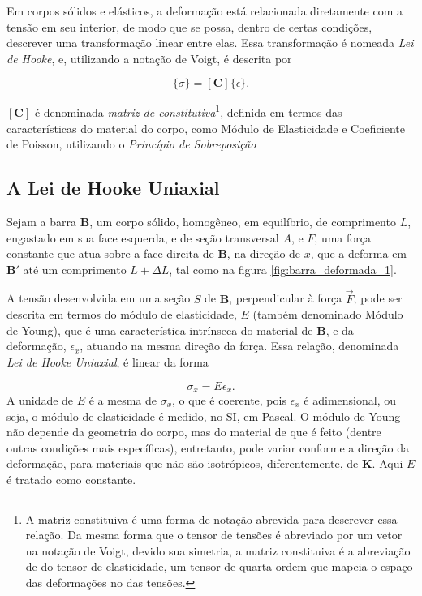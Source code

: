 Em corpos sólidos e elásticos, a deformação está relacionada diretamente com a tensão em seu interior, de modo que se possa, dentro de certas condições, descrever uma transformação linear entre elas. Essa transformação é nomeada \emph{Lei de Hooke}, e, utilizando a notação de Voigt, é descrita por

\begin{equation}
    \{\sigma\} = [\bm{C}] \{\epsilon\}.
    \label{eq:lei_de_hooke}
\end{equation}

$[\bm{C}]$ é denominada \emph{matriz de constitutiva}\footnote{A matriz constituiva é uma forma de notação abrevida para descrever essa relação. Da mesma forma que o tensor de tensões é abreviado por um vetor na notação de Voigt, devido sua simetria, a matriz constituiva é a abreviação de do tensor de elasticidade, um tensor de quarta ordem que mapeia o espaço das deformações no das tensões.}, definida em termos das características do material do corpo, como Módulo de Elasticidade e Coeficiente de Poisson, utilizando o \emph{Princípio de Sobreposição}

\subsection{A Lei de Hooke Uniaxial}

Sejam a barra $\bm{B}$, um corpo sólido, homogêneo, em equilíbrio, de comprimento $L$, engastado em sua face esquerda, e de seção transversal $A$, e $F$, uma força constante que atua sobre a face direita de $\bm{B}$, na direção de $x$, que a deforma em $\bm{B}'$ até um comprimento $L+\Delta L$, tal como na figura \ref{fig:barra_deformada_1}. 



A tensão desenvolvida em uma seção $S$ de $\bm{B}$, perpendicular à força $\vec{F}$, pode ser descrita em termos do módulo de elasticidade, $E$ (também denominado Módulo de Young), que é uma característica intrínseca do material de $\bm{B}$, e da deformação, $\epsilon_x$, atuando na mesma direção da força. Essa relação, denominada \emph{Lei de Hooke Uniaxial}, é linear da forma

\begin{equation}
    \sigma_x = E \epsilon_x.
    \label{eq:lei_de_hooke_uniaxial}
\end{equation} 
A unidade de $E$ é a mesma de $\sigma_x$, o que é coerente, pois $\epsilon_x$ é adimensional, ou seja, o módulo de elasticidade é medido, no SI, em Pascal. O módulo de Young não depende da geometria do corpo, mas do material de que é feito (dentre outras condições mais específicas), entretanto, pode variar conforme a direção da deformação, para materiais que não são isotrópicos, diferentemente, de $\bm{K}$. Aqui $E$ é tratado como constante.

